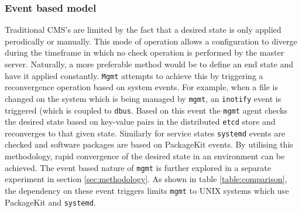 \subsubsection{Event based model}
Traditional CMS's are limited by the fact that a desired state is only applied perodically or manually. This mode of operation allows a configuration to diverge during the timeframe in which no check operation is performed by the master server. Naturally, a more preferable method would be to define an end state and have it applied constantly. \texttt{Mgmt} attempts to achieve this by triggering a reconvergence operation based on system events. For example, when a file is changed on the system which is being managed by \texttt{mgmt}, an \texttt{inotify} event is triggered (which is coupled to \texttt{dbus}. Based on this event the \texttt{mgmt} agent checks the desired state based on key-value pairs in the distributed \texttt{etcd} store and reconverges to that given state. Similarly for service states \texttt{systemd} events are checked and software packages are based on PackageKit events. By utilising this methodology, rapid convergence of the desired state in an environment can be achieved. The event based nature of \texttt{mgmt} is further explored in a separate experiment in section \ref{sec:methodology}. As shown in table \ref{table:comparison}, the dependency on these event triggers limits \texttt{mgmt} to UNIX systems which use PackageKit and \texttt{systemd}.  

